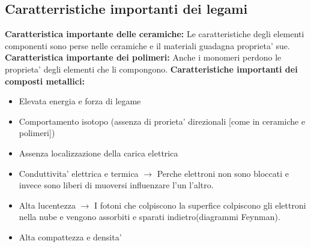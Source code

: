 \documentclass{article}
\begin{document}
            \subsection{Caratterristiche importanti dei legami}
                \hangindent=0.7cm \textbf{Caratteristica importante delle ceramiche:}
                \newline \hangindent=0.7cm Le caratteristiche degli elementi componenti sono perse nelle ceramiche e il materiali guadagna proprieta' sue.
                \newline \newline \textbf{Caratteristica importante dei polimeri:}
                \newline Anche i monomeri perdono le proprieta' degli elementi che li compongono.
                \newline \newline \textbf{Caratteristiche importanti dei composti metallici:}
                \begin{itemize}
                    \item Elevata energia e forza di legame
                    \item Comportamento isotopo (assenza di prorieta' direzionali [come in ceramiche e polimeri])
                    \item Assenza localizzazione della carica elettrica
                    \item Conduttivita' elettrica e termica $\longrightarrow $ Perche elettroni non sono bloccati e invece sono liberi di muoversi influenzare l'un l'altro.
                    \item Alta lucentezza $\longrightarrow $ I fotoni che colpiscono la superfice colpiscono gli elettroni nella nube e vengono assorbiti e sparati indietro(diagrammi Feynman).
                    \item Alta compattezza e densita'
                \end{itemize}
\end{document}
